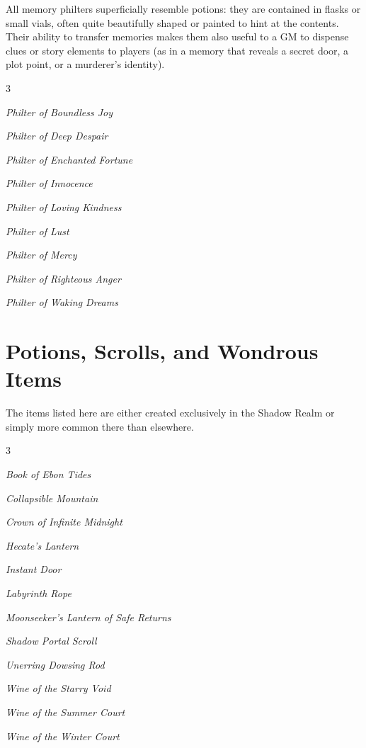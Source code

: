 \documentclass[10pt,a4paper,twoside,bg=print,twocolumn,openany,nodeprecatedcode]{dndbook}
\begin{document}
All memory philters superficially resemble potions: they are contained in flasks or small vials, often quite beautifully shaped or painted to hint at the contents. Their ability to transfer memories makes them also useful to a GM to dispense clues or story elements to players (as in a memory that reveals a secret door, a plot point, or a murderer's identity).


\begin{itemize}
\begin{multicols}{3}
\item \textit{Philter of Boundless Joy}
\item \textit{Philter of Deep Despair}
\item \textit{Philter of Enchanted Fortune}
\item \textit{Philter of Innocence}
\item \textit{Philter of Loving Kindness}
\item \textit{Philter of Lust}
\item \textit{Philter of Mercy}
\item \textit{Philter of Righteous Anger}
\item \textit{Philter of Waking Dreams}
\end{multicols}

\end{itemize}

\section{Potions, Scrolls, and Wondrous Items}
The items listed here are either created exclusively in the Shadow Realm or simply more common there than elsewhere.


\begin{itemize}
\begin{multicols}{3}
\item \textit{Book of Ebon Tides}
\item \textit{Collapsible Mountain}
\item \textit{Crown of Infinite Midnight}
\item \textit{Hecate's Lantern}
\item \textit{Instant Door}
\item \textit{Labyrinth Rope}
\item \textit{Moonseeker's Lantern of Safe Returns}
\item \textit{Shadow Portal Scroll}
\item \textit{Unerring Dowsing Rod}
\item \textit{Wine of the Starry Void}
\item \textit{Wine of the Summer Court}
\item \textit{Wine of the Winter Court}
\end{multicols}

\end{itemize}
\end{document}
